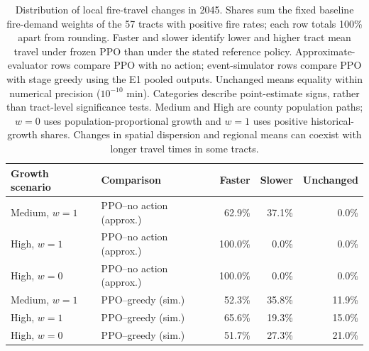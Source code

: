 \begin{table}[htbp]
\centering
\small
\caption{Distribution of local fire-travel changes in 2045. Shares sum the fixed baseline fire-demand weights of the 57 tracts with positive fire rates; each row totals 100\% apart from rounding. Faster and slower identify lower and higher tract mean travel under frozen PPO than under the stated reference policy. Approximate-evaluator rows compare PPO with no action; event-simulator rows compare PPO with stage greedy using the E1 pooled outputs. Unchanged means equality within numerical precision ($10^{-10}$ min). Categories describe point-estimate signs, rather than tract-level significance tests. Medium and High are county population paths; $w=0$ uses population-proportional growth and $w=1$ uses positive historical-growth shares. Changes in spatial dispersion and regional means can coexist with longer travel times in some tracts.}
\label{tab:spatial_consequences}
\setlength{\tabcolsep}{4pt}
\begin{tabular}{llrrr}
\toprule
Growth scenario & Comparison & Faster & Slower & Unchanged \\
\midrule
Medium, $w=1$ & PPO--no action (approx.) & 62.9\% & 37.1\% & 0.0\% \\
High, $w=1$ & PPO--no action (approx.) & 100.0\% & 0.0\% & 0.0\% \\
High, $w=0$ & PPO--no action (approx.) & 100.0\% & 0.0\% & 0.0\% \\
Medium, $w=1$ & PPO--greedy (sim.) & 52.3\% & 35.8\% & 11.9\% \\
High, $w=1$ & PPO--greedy (sim.) & 65.6\% & 19.3\% & 15.0\% \\
High, $w=0$ & PPO--greedy (sim.) & 51.7\% & 27.3\% & 21.0\% \\
\bottomrule
\end{tabular}
\end{table}
